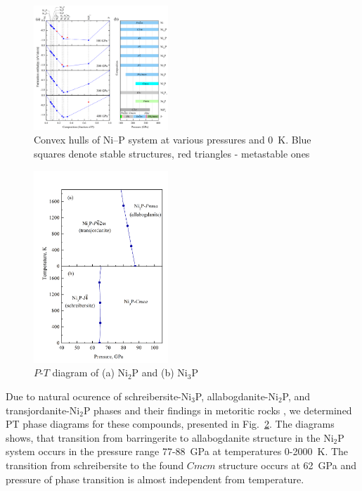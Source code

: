 \documentclass[twoside,twocolumn,9pt]{article}
\begin{document}
\begin{figure}[h]
 \centering
 \includegraphics[width=0.45\textwidth]{convex_hull-2.png} %
 \caption{Convex hulls of Ni--P system at various pressures and 0~K. Blue squares denote stable structures, red triangles - metastable ones}
 \label{fgr:convex_hull}
\end{figure}


\begin{figure}[h]
\centering
  \includegraphics[width=0.45\textwidth]{pt_Ni2P_Ni3P.png}
  \caption{$P$-$T$ diagram of (a) Ni$_2$P and (b) Ni$_3$P}
  \label{fgr:PT-Ni2P-Ni3P}
\end{figure}


Due to natural ocurence of schreibersite-Ni$_3$P, allabogdanite-Ni$_2$P, and transjordanite-Ni$_2$P phases and their findings in metoritic rocks \cite{}, we determined PT phase diagrams for these compounds, presented in Fig.~\ref{fgr:PT-Ni2P-Ni3P}. 
The diagrams shows, that transition from barringerite to allabogdanite structure in the Ni$_2$P system occurs in the pressure range 77-88~GPa at temperatures 0-2000~K.
The transition from schreibersite to the found $Cmcm$ structure occurs at 62~GPa and pressure of phase transition is almost independent from temperature.
\end{document}
